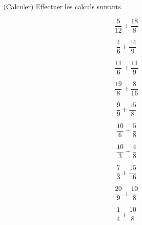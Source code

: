  (Calculer) Effectuer les calculs suivants

\begin{multicols}{5}
$$\dfrac{5}{12}+\dfrac{18}{8}$$

$$\dfrac{4}{6}+\dfrac{14}{9}$$

$$\dfrac{11}{6}+\dfrac{11}{9}$$

$$\dfrac{19}{8}+\dfrac{8}{16}$$

$$\dfrac{9}{9}+\dfrac{15}{8}$$

$$\dfrac{10}{6}+\dfrac{5}{8}$$

$$\dfrac{10}{3}+\dfrac{4}{8}$$

$$\dfrac{7}{3}+\dfrac{15}{16}$$

$$\dfrac{20}{9}+\dfrac{10}{8}$$

$$\dfrac{1}{4}+\dfrac{10}{8}$$

\end{multicols}